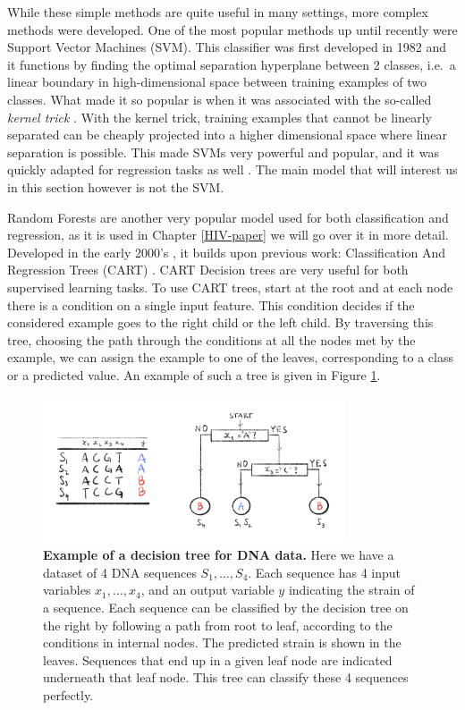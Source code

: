 \documentclass[
  11pt,
  twoside,
  BCOR=10mm,
  listof=totoc]{scrbook}
\newcommand{\extcaption}[2]{
    \caption[#1]{
        \textbf{#1}\newline
        #2
    }
}
\begin{document}
While these simple methods are quite useful in many settings, more complex methods were developed. One of the most popular methods up until recently were Support Vector Machines (SVM). This classifier was first developed in 1982 \autocite{vapnikEstimationDependencesBased1982} and it functions by finding the optimal separation hyperplane between 2 classes, i.e.~a linear boundary in high-dimensional space between training examples of two classes. What made it so popular is when it was associated with the so-called \emph{kernel trick} \autocite{boserTrainingAlgorithmOptimal1992,cortesSupportvectorNetworks1995}. With the kernel trick, training examples that cannot be linearly separated can be cheaply projected into a higher dimensional space where linear separation is possible. This made SVMs very powerful and popular, and it was quickly adapted for regression tasks as well \autocite{druckerSupportVectorRegression1996}. The main model that will interest us in this section however is not the SVM.

Random Forests are another very popular model used for both classification and regression, as it is used in Chapter \ref{HIV-paper} we will go over it in more detail. Developed in the early 2000's \autocite{breimanRandomForests2001}, it builds upon previous work: Classification And Regression Trees (CART) \autocite{breimanClassificationRegressionTrees1983}. CART Decision trees are very useful for both supervised learning tasks. To use CART trees, start at the root and at each node there is a condition on a single input feature. This condition decides if the considered example goes to the right child or the left child. By traversing this tree, choosing the path through the conditions at all the nodes met by the example, we can assign the example to one of the leaves, corresponding to a class or a predicted value. An example of such a tree is given in Figure \ref{fig:cart}.

\begin{figure}
\centering
\includegraphics[width=0.8\textwidth]{figures/Encode-seqs/cart.png}
\extcaption{Example of a decision tree for DNA data.}{Here we have a dataset of 4 DNA sequences $S_1, \ldots, S_4$. Each sequence has 4 input variables $x_1,\ldots,x_4$, and an output variable $y$ indicating the strain of a sequence. Each sequence can be classified by the decision tree on the right by following a path from root to leaf, according to the conditions in internal nodes. The predicted strain is shown in the leaves. Sequences that end up in a given leaf node are indicated underneath that leaf node. This tree can classify these 4 sequences perfectly.}
\label{fig:cart}
\end{figure}
\end{document}
